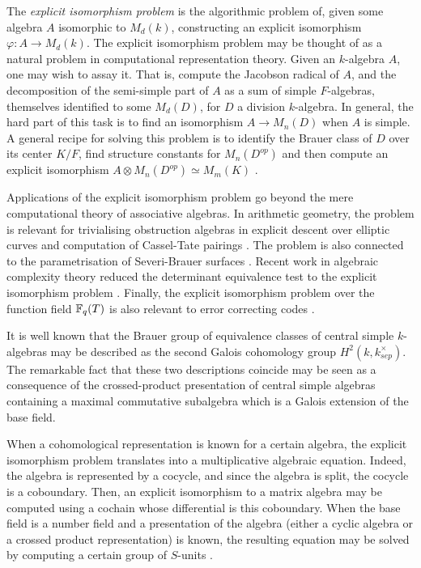 The \emph{explicit isomorphism problem} is the algorithmic problem of, given some algebra \(A\) isomorphic to \(M_d(k)\), constructing an explicit isomorphism \(\varphi\colon A \to M_d(k)\). The explicit isomorphism problem may be thought of as a natural problem in computational representation theory. Given an \(k\)-algebra \(A\), one may wish to assay it. That is, compute the Jacobson radical of \(A\), and the decomposition of the semi-simple part of \(A\) as a sum of simple \(F\)-algebras, themselves identified to some \(M_d(D)\), for \(D\) a division \(k\)-algebra. In general, the hard part of this task is to find an isomorphism \(A \to M_n(D)\) when \(A\) is simple. A general recipe for solving this problem is to identify the Brauer class of \(D\) over its center \(K/F\), find structure constants for \(M_n(D^{op})\) and then compute an explicit isomorphism \(A \otimes M_n(D^{op}) \simeq M_m(K)\) \cite{ivanyos2012splitting,gomez2022primitive,csahok2022explicit}.

Applications of the explicit isomorphism problem go beyond the mere computational theory of associative algebras. In arithmetic geometry, the problem is relevant for trivialising obstruction algebras in explicit descent over elliptic curves \cite{cremona2008explicit,cremona2009explicit,cremona2015explicit,fisher2013explicit} and computation of Cassel-Tate pairings \cite{fisher2014computing,yan2021computing}. The problem is also connected to the parametrisation of Severi-Brauer surfaces \cite{de2006lie}. Recent work in algebraic complexity theory reduced the determinant equivalence test to the explicit isomorphism problem \cite{garg2019determinant}. Finally, the explicit isomorphism problem over the function field \(\mathbb{F}_q(T)\) is also relevant to error correcting codes \cite{gomez2022primitive}.

It is well known that the Brauer group of equivalence classes of central simple \(k\)-algebras may be described as the second Galois cohomology group \(H^2(k,k_{sep}^\times)\). The remarkable fact that these two descriptions coincide may be seen as a consequence of the crossed-product presentation of central simple algebras containing a maximal commutative subalgebra which is a Galois extension of the base field.

When a cohomological representation is known for a certain algebra, the explicit isomorphism problem translates into a multiplicative algebraic equation. Indeed, the algebra is represented by a cocycle, and since the algebra is split, the cocycle is a coboundary. Then, an explicit isomorphism to a matrix algebra may be computed using a cochain whose differential is this coboundary. When the base field is a number field and a presentation of the algebra (either a cyclic algebra or a crossed product representation) is known, the resulting equation may be solved by computing a certain group of \(S\)-units \cite{simon2002solving,fieker2009minimizing}. 

